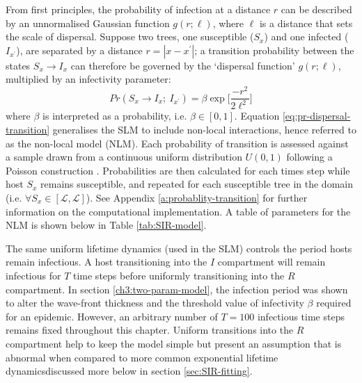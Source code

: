 From first principles, the probability of infection at a distance $r$ can be described by an unnormalised Gaussian function $g(r; \ell)$,
where $\ell$ is a distance that sets the scale of dispersal. 
Suppose two trees, one susceptible ($S_x$) and one infected ($I_{x^\prime}$), are separated by a distance $r=|x - x^\prime|$;
a transition probability between the states $S_x \rightarrow I_x$ can therefore be governed by the `dispersal function' $g(r; \ell)$, multiplied by an infectivity parameter:
\begin{equation}
\label{eq:pr-dispersal-transition}
    Pr(S_{x} \rightarrow I_{x} ;\ I_{x^{\prime}} ) = \beta \exp\Big[\frac{-r^2}{2\ell^2}\Big]
\end{equation}
where $\beta$ is interpreted as a probability, i.e. $\beta \in [0, 1]$. 
Equation \ref{eq:pr-dispersal-transition} generalises the SLM to include non-local interactions, hence referred to as the non-local model (NLM).
Each probability of transition is assessed against a sample drawn from a continuous uniform distribution $U(0, 1)$ following a Poisson construction \cite{cook2008constructing}. 
Probabilities are then calculated for each times step while host $S_x$ 
remains susceptible, and repeated for each susceptible tree in the domain (i.e. $\forall S_x \in [\mathcal{L}, \mathcal{L}]$).
See Appendix \ref{a:probablity-transition} for further information on the computational implementation. A table of parameters for the NLM is shown below in Table \ref{tab:SIR-model}.

The same uniform lifetime dynamics (used in the SLM) controls the period hosts remain infectious.
A host transitioning into the $I$ compartment will remain infectious for $T$ time steps before uniformly transitioning into the $R$ compartment.
In section \ref{ch3:two-param-model}, the infection period was shown to alter the wave-front thickness and the threshold value of infectivity $\beta$ required for an epidemic. 
However, an arbitrary number of $T=100$ infectious time steps remains fixed throughout this chapter.
Uniform transitions into the $R$ compartment help to keep the model simple but present an assumption that is abnormal when compared to more common exponential lifetime dynamics\textemdash discussed more below in section \ref{sec:SIR-fitting}.

